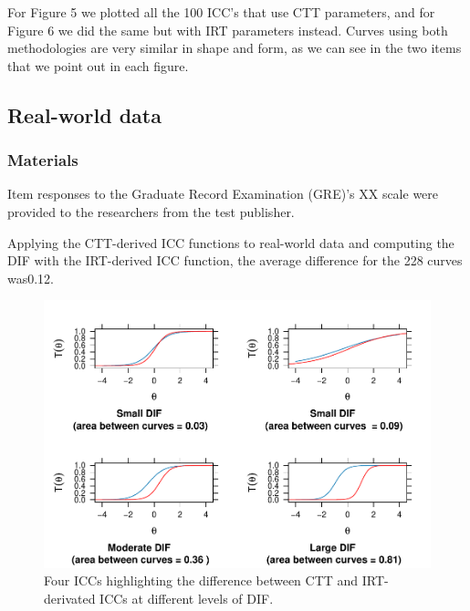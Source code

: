 \documentclass[
  jou]{apa6}
\begin{document}
For Figure 5 we plotted all the 100 ICC's that use CTT parameters, and for Figure 6 we did the same but with IRT parameters instead. Curves using both methodologies are very similar in shape and form, as we can see in the two items that we point out in each figure.

\hypertarget{real-world-data}{%
\subsection{Real-world data}\label{real-world-data}}

\hypertarget{materials}{%
\subsubsection{Materials}\label{materials}}

Item responses to the Graduate Record Examination (GRE)'s XX scale were provided to the researchers from the test publisher.

Applying the CTT-derived ICC functions to real-world data and computing the DIF with the IRT-derived ICC function, the average difference for the 228 curves was0.12.

\begin{figure}
\centering
\includegraphics{ICC_project_files/figure-latex/plotting-1.pdf}
\caption{\label{fig:plotting}Four ICCs highlighting the difference between CTT and IRT-derivated ICCs at different levels of DIF.}
\end{figure}
\end{document}
